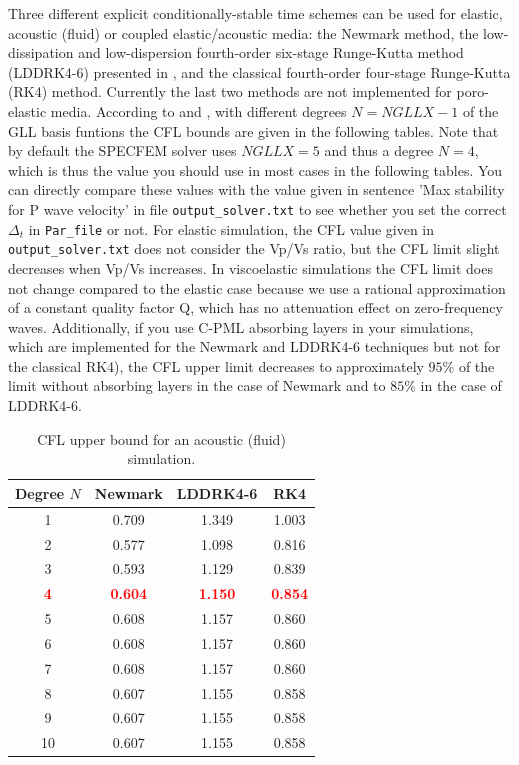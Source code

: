 \documentclass[oneside,english,onecolumn,letterpaper]{book}
\newcommand{\red}[1]{\textbf{\textcolor{Red}{#1}}}
\begin{document}
Three different explicit conditionally-stable time schemes can be used for elastic, acoustic (fluid) or coupled elastic/acoustic media:
the Newmark method, the low-dissipation and low-dispersion fourth-order six-stage Runge-Kutta method (LDDRK4-6) presented in \cite{BeBoBa06},
and the classical fourth-order four-stage Runge-Kutta (RK4) method.
Currently the last two methods are not implemented for poro-elastic media.
According to \cite{DeSe10} and \cite{BeBoBa06}, with different degrees $N=NGLLX-1$ of the GLL basis funtions the CFL bounds are given in the following tables.
Note that by default the SPECFEM solver uses $NGLLX = 5$ and thus a degree $N = 4$, which is thus the value you should use
in most cases in the following tables.
You can directly compare these values with the value given in sentence 'Max stability for P wave velocity' in file
\texttt{output\_solver.txt} to see whether you set the correct $\Delta_t$ in \texttt{Par\_file} or not.
For elastic simulation, the
CFL value given in \texttt{output\_solver.txt} does not consider the Vp/Vs ratio, but the CFL limit slight decreases when Vp/Vs increases.
In viscoelastic simulations the CFL limit does not change compared to the elastic case because we use a rational approximation of a constant quality factor Q, which has no attenuation effect on zero-frequency waves.
Additionally, if you use C-PML absorbing layers in your simulations, which are implemented for the Newmark and LDDRK4-6 techniques but not for the classical RK4), the CFL upper limit decreases to approximately $95\%$ of the limit without absorbing layers in the case of Newmark and to $85\%$ in the case of LDDRK4-6.
\begin{table}[hb]
\caption{CFL upper bound for an acoustic (fluid) simulation.}
\centering
\begin{tabular}{c c c c}
\hline\hline
Degree $N$ & Newmark & LDDRK4-6 & RK4 \\ [0.5ex]
\hline
1 & 0.709 & 1.349 & 1.003 \\
2 & 0.577 & 1.098 & 0.816 \\
3 & 0.593 & 1.129 & 0.839 \\
\red{4} & \red{0.604} & \red{1.150} & \red{0.854} \\
5 & 0.608 & 1.157 & 0.860 \\
6 & 0.608 & 1.157 & 0.860 \\
7 & 0.608 & 1.157 & 0.860 \\
8 & 0.607 & 1.155 & 0.858 \\
9 & 0.607 & 1.155 & 0.858 \\
10 & 0.607 & 1.155 & 0.858 \\ [1ex]
\hline
\end{tabular}
\label{table:CFLacoustic}
\end{table}
\end{document}
